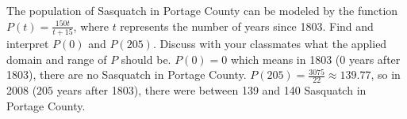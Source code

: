 {The population of Sasquatch in Portage County can be modeled by the function $P(t) = \frac{150t}{t + 15}$, where $t$ represents the number of  years since 1803.  Find and interpret $P(0)$ and $P(205)$.  Discuss with your classmates what the applied domain and range of $P$ should be.\label{Sasquatchfunc1} }
{$P(0) = 0$ which means in 1803 ($0$ years after 1803), there are no Sasquatch in Portage County.  $P(205) = \frac{3075}{22} \approx 139.77$, so in 2008 ($205$ years after 1803), there were between 139 and 140 Sasquatch in Portage County.}